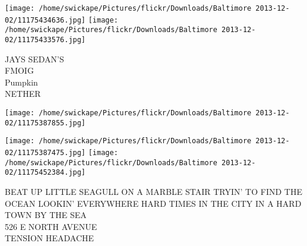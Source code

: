\documentclass[10pt,letterpaper]{article}
\begin{document}
\texttt{[image: /home/swickape/Pictures/flickr/Downloads/Baltimore 2013-12-02/11175434636.jpg]}
\texttt{[image: /home/swickape/Pictures/flickr/Downloads/Baltimore 2013-12-02/11175433576.jpg]}

JAYS SEDAN'S\\
FMOIG\\
Pumpkin\\
NETHER\\
\pagebreak

\texttt{[image: /home/swickape/Pictures/flickr/Downloads/Baltimore 2013-12-02/11175387855.jpg]}

\vspace{0.25in}
\texttt{[image: /home/swickape/Pictures/flickr/Downloads/Baltimore 2013-12-02/11175387475.jpg]}
\texttt{[image: /home/swickape/Pictures/flickr/Downloads/Baltimore 2013-12-02/11175452384.jpg]}

BEAT UP LITTLE SEAGULL ON A MARBLE STAIR TRYIN' TO FIND THE OCEAN LOOKIN' EVERYWHERE HARD TIMES IN THE CITY IN A HARD TOWN BY THE SEA\\
526 E NORTH AVENUE\\
TENSION HEADACHE\\
\pagebreak
\end{document}
